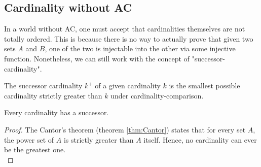 \subsection{Cardinality without AC}
In a world without AC, one must accept that cardinalities themselves are not totally ordered. 
This is because there is no way to actually prove that given two sets $A$ and $B$, one of the
two is injectable into the other via some injective function. Nonetheless, we can still work 
with the concept of "successor-cardinality". 

\begin{definition}
    The successor cardinality $k^{+}$ of a given cardinality $k$ is 
    the smallest possible cardinality strictly greater than $k$ under cardinality-comparison. 
\end{definition}

\begin{lemma}
    Every cardinality has a successor.
\end{lemma}
\begin{proof}
    The Cantor's theorem (theorem \ref{thm:Cantor}) states that for every set $A$, 
    the power set of $A$ is strictly greater than $A$ itself. Hence, no cardinality 
    can ever be the greatest one. \\
\end{proof}
\newpage